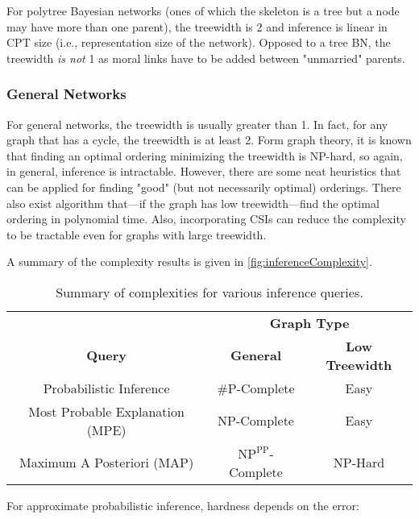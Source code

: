				For polytree Bayesian networks (ones of which the skeleton is a tree but a node may have more than one parent), the treewidth is \num{2} and inference is linear in CPT size (i.e., representation size of the network). Opposed to a tree BN, the treewidth \emph{is not} \num{1} as moral links have to be added between "unmarried" parents.

			\subsubsection{General Networks}
				For general networks, the treewidth is usually greater than \num{1}. In fact, for any graph that has a cycle, the treewidth is at least \num{2}. Form graph theory, it is known that finding an optimal ordering minimizing the treewidth is NP-hard, so again, in general, inference is intractable. However, there are some neat heuristics that can be applied for finding "good" (but not necessarily optimal) orderings. There also exist algorithm that---if the graph has low treewidth---find the optimal ordering in polynomial time. Also, incorporating CSIs can reduce the complexity to be tractable even for graphs with large treewidth.

				A summary of the complexity results is given in \autoref{fig:inferenceComplexity}.

				\begin{table}
					\centering
					\begin{tabular}{c|c|c}
						\toprule
						                                & \multicolumn{2}{c}{\textbf{Graph Type}}                   \\
						\textbf{Query}                  & \textbf{General}                 & \textbf{Low Treewidth} \\ \midrule
						Probabilistic Inference         & \#P-Complete                     & Easy                   \\
						Most Probable Explanation (MPE) & NP-Complete                      & Easy                   \\
						Maximum A Posteriori (MAP)      & \(\text{NP}^\text{PP}\)-Complete & NP-Hard                \\ \bottomrule
					\end{tabular}
					\begin{center}
						For approximate probabilistic inference, hardness depends on the error: \\
						 \\
					\end{center}
					\vspace{-0.4cm}
					\caption[Summary of Inference Complexities]{Summary of complexities for various inference queries.}
					\label{fig:inferenceComplexity}
				\end{table}

